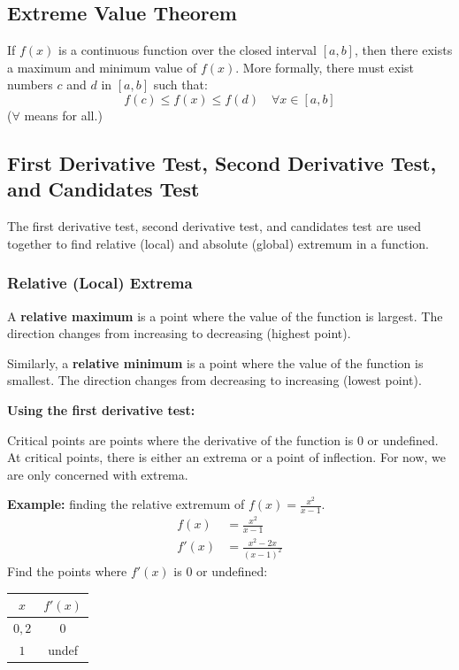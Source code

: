 \documentclass[12pt]{article}
\begin{document}
\subsection{Extreme Value Theorem}
If $f(x)$ is a continuous function over the closed interval $[a, b]$, then there exists a maximum and minimum value of $f(x)$. More formally, there must exist numbers $c$ and $d$ in $[a, b]$ such that:
\[ f(c) \le f(x) \le f(d) \quad \forall x \in [a, b] \]
($\forall$ means for all.)

\subsection[First Derivative Test, Second Derivative Test, and Candidates Test]{First Derivative Test, Second Derivative Test, \\and Candidates Test}
The first derivative test, second derivative test, and candidates test are used together to find relative (local) and absolute (global) extremum in a function.

\subsubsection{Relative (Local) Extrema}
A \textbf{relative maximum} is a point where the value of the function is largest. The direction changes from increasing to decreasing (highest point).

Similarly, a \textbf{relative minimum} is a point where the value of the function is smallest. The direction changes from decreasing to increasing (lowest point).

\noindent \textbf{Using the first derivative test:}

Critical points are points where the derivative of the function is $0$ or undefined. At critical points, there is either an extrema or a point of inflection. For now, we are only concerned with extrema.

\noindent \textbf{Example:} finding the relative extremum of $f(x) = \frac{x^2}{x-1}$.
\begin{align*}
	f(x)  & = \frac{x^2}{x-1}        \\[6pt]
	f'(x) & = \frac{x^2-2x}{(x-1)^2}
\end{align*}
Find the points where $f'(x)$ is $0$ or undefined:
\begin{center}
	\begin{tabular}{|c|c|}
		\hline
		$x$    & $f'(x)$ \\
		\hline \hline
		$0, 2$ & $0$     \\
		\hline
		$1$    & undef   \\
		\hline
	\end{tabular}
\end{center}
\end{document}
